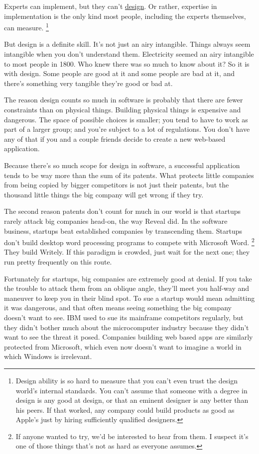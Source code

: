 \documentclass[12pt]{book}
\begin{document}
Experts can implement, but they can't \href{taste.html}{design}. Or
rather, expertise in implementation is the only kind most people,
including the experts themselves, can measure. \footnote{Design ability is so hard to measure that you can't even trust
the design world's internal standards. You can't assume that someone
with a degree in design is any good at design, or that an eminent
designer is any better than his peers. If that worked, any company could
build products as good as Apple's just by hiring sufficiently qualified
designers.}

But design is a definite skill. It's not just an airy intangible. Things
always seem intangible when you don't understand them. Electricity
seemed an airy intangible to most people in 1800. Who knew there was so
much to know about it? So it is with design. Some people are good at it
and some people are bad at it, and there's something very tangible
they're good or bad at.

The reason design counts so much in software is probably that there are
fewer constraints than on physical things. Building physical things is
expensive and dangerous. The space of possible choices is smaller; you
tend to have to work as part of a larger group; and you're subject to a
lot of regulations. You don't have any of that if you and a couple
friends decide to create a new web-based application.

Because there's so much scope for design in software, a successful
application tends to be way more than the sum of its patents. What
protects little companies from being copied by bigger competitors is not
just their patents, but the thousand little things the big company will
get wrong if they try.

The second reason patents don't count for much in our world is that
startups rarely attack big companies head-on, the way Reveal did. In the
software business, startups beat established companies by transcending
them. Startups don't build desktop word processing programs to compete
with Microsoft Word. \footnote{If anyone wanted to try, we'd be interested to hear from them. I
suspect it's one of those things that's not as hard as everyone assumes.} They build Writely. If this
paradigm is crowded, just wait for the next one; they run pretty
frequently on this route.

Fortunately for startups, big companies are extremely good at denial. If
you take the trouble to attack them from an oblique angle, they'll meet
you half-way and maneuver to keep you in their blind spot. To sue a
startup would mean admitting it was dangerous, and that often means
seeing something the big company doesn't want to see. IBM used to sue
its mainframe competitors regularly, but they didn't bother much about
the microcomputer industry because they didn't want to see the threat it
posed. Companies building web based apps are similarly protected from
Microsoft, which even now doesn't want to imagine a world in which
Windows is irrelevant.
\end{document}
